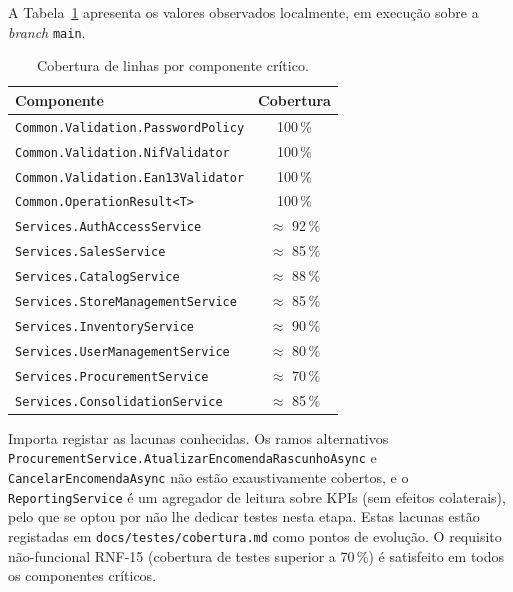    A Tabela~\ref{tab:cobertura_componente} apresenta os valores observados localmente, em execução sobre a \textit{branch} \texttt{main}.

    \begin{table}[H]
    \centering
    \small
    \begin{tabular}{|p{8cm}|c|}
    \hline
    \textbf{Componente} & \textbf{Cobertura} \\
    \hline
    \texttt{Common.Validation.PasswordPolicy}  & 100\,\% \\
    \hline
    \texttt{Common.Validation.NifValidator}    & 100\,\% \\
    \hline
    \texttt{Common.Validation.Ean13Validator}  & 100\,\% \\
    \hline
    \texttt{Common.OperationResult<T>}         & 100\,\% \\
    \hline
    \texttt{Services.AuthAccessService}        & $\approx$ 92\,\% \\
    \hline
    \texttt{Services.SalesService}             & $\approx$ 85\,\% \\
    \hline
    \texttt{Services.CatalogService}           & $\approx$ 88\,\% \\
    \hline
    \texttt{Services.StoreManagementService}   & $\approx$ 85\,\% \\
    \hline
    \texttt{Services.InventoryService}         & $\approx$ 90\,\% \\
    \hline
    \texttt{Services.UserManagementService}    & $\approx$ 80\,\% \\
    \hline
    \texttt{Services.ProcurementService}       & $\approx$ 70\,\% \\
    \hline
    \texttt{Services.ConsolidationService}     & $\approx$ 85\,\% \\
    \hline
    \end{tabular}
    \caption{Cobertura de linhas por componente crítico.}
    \label{tab:cobertura_componente}
    \end{table}

    Importa registar as lacunas conhecidas. Os ramos alternativos \texttt{ProcurementService.AtualizarEncomendaRascunhoAsync} e \texttt{CancelarEncomendaAsync} não estão exaustivamente cobertos, e o \texttt{ReportingService} é um agregador de leitura sobre KPIs (sem efeitos colaterais), pelo que se optou por não lhe dedicar testes nesta etapa. Estas lacunas estão registadas em \texttt{docs/testes/cobertura.md} como pontos de evolução. O requisito não-funcional RNF-15 (cobertura de testes superior a 70\,\%) é satisfeito em todos os componentes críticos.

